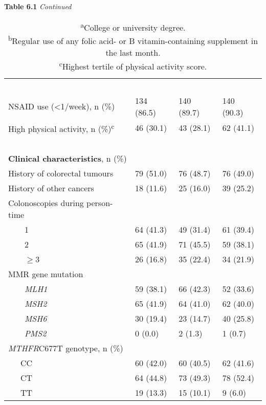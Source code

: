 \begin{table}
\caption*{\textbf{Table 6.1} \emph{Continued}}
\label{table6_1}
\begin{adjustbox}{width=\textwidth}
\begin{tabular}{L{4.8cm}C{3.5cm}C{3.5cm}C{3.5cm}}
~ & ~ & ~ & ~\\
 NSAID use ({\textless}1/week), n (\%) & 134 (86.5) & 140 (89.7) & 140 (90.3)\\
{High physical activity, n (\%)}{\textsuperscript{c}} & 46 (30.1) & 43 (28.1) & 62 (41.1)\\
~ & ~ & ~ & ~\\
{\textbf{Clinical characteristics}}{, n (\%)} & ~ & ~ & ~ \\
{History of colorectal tumours} & 79 (51.0) & 76 (48.7) & 76 (49.0)\\
 History of other cancers & 18 (11.6) & 25 (16.0) & 39 (25.2)\\
 Colonoscopies during person-time & ~ & ~ & ~ \\
 \ \ \ \ 1 & 64 (41.3) & 49 (31.4) & 61 (39.4)\\
 \ \ \ \ 2 & 65 (41.9) & 71 (45.5) & 59 (38.1)\\
 \ \ \ \ ${\geq}$3 & 26 (16.8) & 35 (22.4) & {34 (21.9)}\\
 MMR gene mutation & ~ & ~ & ~ \\
 \ \ \ \ \emph{MLH1} & 59 (38.1) & 66 (42.3) & 52 (33.6)\\
 \ \ \ \ \emph{MSH2} \ \ & 65 (41.9) & 64 (41.0) & 62 (40.0)\\
 \ \ \ \ \emph{MSH6} & 30 (19.4) & 23 (14.7) & 40 (25.8)\\
 \ \ \ \ \emph{PMS2} & 0 (0.0) & 2 (1.3) & 1 (0.7)\\
{\textit{MTHFR}}{C677T genotype, n (\%)} & ~ & ~ & ~ \\
 \ \ \ CC & 60 (42.0) & 60 (40.5) & 62 (41.6)\\
 \ \ \ CT & 64 (44.8) & 73 (49.3) & 78 (52.4)\\
 \ \ \ TT & 19 (13.3) & 15 (10.1) & 9 (6.0)\\

\hline
\end{tabular}
\end{adjustbox}
\caption*{\footnotesize{\textsuperscript{a}College or university degree.\\\textsuperscript{b}Regular use of any folic acid- or B vitamin-containing supplement in the last month.\\\textsuperscript{c}Highest tertile of physical activity score.}}
\end{table}



